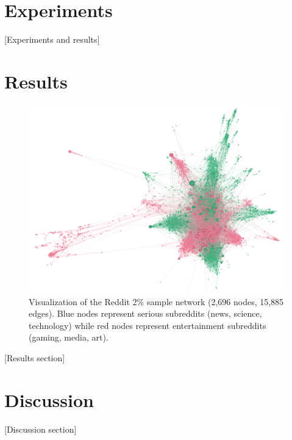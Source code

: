 \documentclass[linenumbers]{aastex701}
\begin{document}
\section{Experiments} \label{sec:experiments}

[Experiments and results]

\section{Results} \label{sec:results}

\begin{figure}[ht!]
\centering
\includegraphics[width=0.85\linewidth]{reddit_2_percent_graph.png}
\caption{Visualization of the Reddit 2\% sample network (2,696 nodes, 15,885 edges). Blue nodes represent serious subreddits (news, science, technology) while red nodes represent entertainment subreddits (gaming, media, art).}
\label{fig:reddit_network}
\end{figure}

[Results section]

\section{Discussion} \label{sec:discussion}

[Discussion section]

\end{document}
